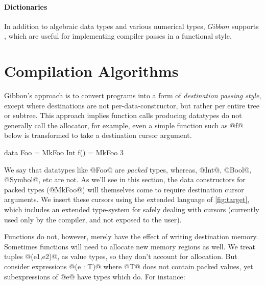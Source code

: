 \documentclass[a4paper,english]{lipics-v2016}
\newcommand{\treelang}{Gibbon\xspace} %
\newif\ifcurly
\newcommand{\finishmecurly}{\ifcurly \Red{FINISHME - do ifcurly version here} \else}
\begin{document}


\paragraph*{Dictionaries}

In addition to algebraic data types and various numerical types, $\treelang{}$ supports
, which are useful for implementing compiler
passes in a functional style.





\section{Compilation Algorithms}

\treelang{}'s approach is to convert programs into a form of {\em destination
  passing style}, except where destinations are not per-data-constructor, but
rather per entire tree or subtree.  This approach implies function calls
producing datatypes do not generally call the allocator, for example, even a
simple function such as @f@ below is transformed to take a destination cursor
argument.

\finishmecurly
\begin{code}
  data Foo = MkFoo Int
  f() = MkFoo 3
\end{code}
\fi

We say that datatypes like @Foo@ are {\em packed} types, whereas, @Int@, @Bool@,
@Symbol@, etc are not.  As we'll see in this section, the data constructors for
packed types (@MkFoo@) will themselves come to require destination cursor arguments.
%
We insert these cursors using the extended language of \cref{fig:target}, which
includes an extended type-system for safely dealing with cursors (currently used
only by the compiler, and not exposed to the user).

Functions do not, however, merely have the effect of writing destination memory.
Sometimes functions will need to allocate new memory regions as well.  We treat
tuples @(e1,e2)@, as value types, so they don't account for allocation.  But
consider expressions @(e : T)@ where @T@ does not contain packed values, yet
subexpressions of @e@ have types which do.  For instance:
\end{document}
